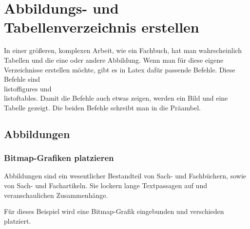 \section{Abbildungs- und Tabellenverzeichnis erstellen}

In einer größeren, komplexen Arbeit, wie ein Fachbuch, hat man wahrscheinlich Tabellen und die eine oder andere Abbildung. Wenn man für diese eigene Verzeichnisse erstellen möchte, gibt es in Latex dafür passende Befehle. Diese Befehle sind \\listoffigures und \\listoftables. Damit die Befehle auch etwas zeigen, werden ein Bild und eine Tabelle gezeigt. Die beiden Befehle schreibt man in die Präambel.

\subsection{Abbildungen}

\subsubsection{Bitmap-Grafiken platzieren}

Abbildungen sind ein wesentlicher Bestandteil von Sach- und Fachbüchern, sowie von Sach- und Fachartikeln. Sie lockern lange Textpassagen auf und veranschaulichen Zusammenhänge.

Für dieses Beispiel wird eine Bitmap-Grafik eingebunden und verschieden platziert.